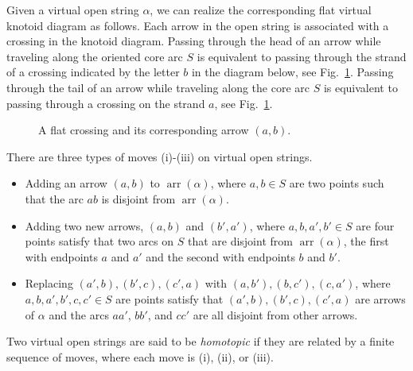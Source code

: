 \documentclass[11pt]{amsart}
\theoremstyle{noparens}
\numberwithin{equation}{section}
\numberwithin{equation}{section}
\begin{document}
Given a virtual open string $\alpha$, we can realize the corresponding flat virtual knotoid diagram as follows. Each arrow in the open string is associated with a crossing in the knotoid diagram. Passing through the head of an arrow while traveling along the oriented core arc $S$ is equivalent to passing through the strand of a crossing indicated by the letter $b$ in the diagram below, see Fig.~\ref{fig127}. Passing through the tail of an arrow while traveling along the core arc $S$ is equivalent to passing through a crossing on the strand $a$, see  Fig.~\ref{fig127}.
\begin{figure}[htbp]
\begin{center}
\caption{A flat crossing and its corresponding arrow $(a,b)$.\label{fig127}}
\end{center}
\end{figure}

There are three types of moves (i)-(iii) on virtual open strings. 
\begin{itemize}
\item[(i)] Adding an arrow $(a, b)$ to $\operatorname{arr}(\alpha)$, where $a, b \in S$ are two points such that the arc $ab$ is disjoint from $\operatorname{arr}(\alpha)$.
\item[(ii)] Adding two new arrows, $(a, b)$ and $(b',a')$, where $a, b, a', b' \in S$ are four points satisfy that two arcs on $S$ that are disjoint from $\operatorname{arr}(\alpha)$, the first with endpoints $a$ and $a'$ and the second with endpoints $b$ and $b'$.
\item[(iii)] Replacing $(a',b), (b',c), (c',a)$ with $(a, b'), (b, c'), (c, a')$, where $a, b, a', b', c, c' \in S$ are points satisfy that $(a',b), (b',c), (c',a)$ are arrows of $\alpha$ and the arcs $aa'$, $bb'$, and $cc'$ are all disjoint from other arrows.
\end{itemize}
Two virtual open strings are said to be \textit{homotopic} if they are related by a finite sequence of moves, where each move is (i), (ii), or (iii). 
\end{document}
